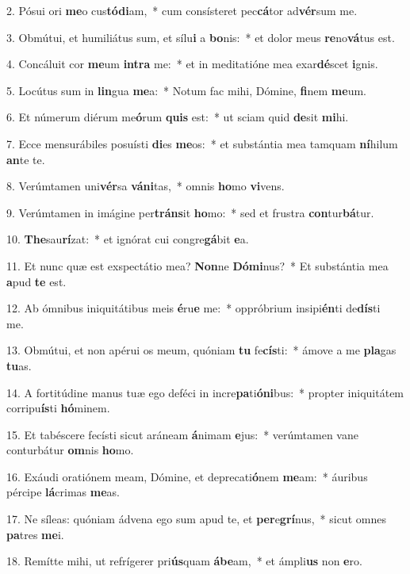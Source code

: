 2. Pósui ori \textbf{me}o cus\textbf{tó}\textbf{di}am,~*  cum consísteret pec\textbf{cá}tor ad\textbf{vér}sum me.\

3. Obmútui, et humiliátus sum, et sílu\textbf{i} a \textbf{bo}nis:~*  et dolor meus \textbf{re}no\textbf{vá}tus est.\

4. Concáluit cor \textbf{me}um \textbf{in}\textbf{tra} me:~*  et in meditatióne mea exar\textbf{dé}scet \textbf{i}gnis.\

5. Locútus sum in \textbf{lin}gua \textbf{me}a:~*  Notum fac mihi, Dómine, \textbf{fi}nem \textbf{me}um.\

6. Et númerum diérum me\textbf{ó}rum \textbf{quis} est:~*  ut sciam quid \textbf{de}sit \textbf{mi}hi.\

7. Ecce mensurábiles posuísti \textbf{di}es \textbf{me}os:~*  et substántia mea tamquam \textbf{ní}hilum \textbf{an}te te.\

8. Verúmtamen uni\textbf{vér}sa \textbf{vá}\textbf{ni}tas,~*  omnis \textbf{ho}mo \textbf{vi}vens.\

9. Verúmtamen in imágine per\textbf{tráns}it \textbf{ho}mo:~*  sed et frustra \textbf{con}tur\textbf{bá}tur.\

10. \textbf{The}sau\textbf{rí}zat:~*  et ignórat cui congre\textbf{gá}bit \textbf{e}a.\

11. Et nunc quæ est exspectátio mea? \textbf{Non}ne \textbf{Dó}\textbf{mi}nus?~*  Et substántia mea \textbf{a}pud \textbf{te} est.\

12. Ab ómnibus iniquitátibus meis \textbf{é}ru\textbf{e} me:~*  oppróbrium insipi\textbf{én}ti de\textbf{dís}ti me.\

13. Obmútui, et non apérui os meum, quóniam \textbf{tu} fe\textbf{cís}ti:~*  ámove a me \textbf{pla}gas \textbf{tu}as.\

14. A fortitúdine manus tuæ ego deféci in incre\textbf{pa}ti\textbf{ó}\textbf{ni}bus:~*  propter iniquitátem corripu\textbf{ís}ti \textbf{hó}minem.\

15. Et tabéscere fecísti sicut aráneam \textbf{á}nimam \textbf{e}jus:~*  verúmtamen vane conturbátur \textbf{om}nis \textbf{ho}mo.\

16. Exáudi oratiónem meam, Dómine, et deprecati\textbf{ó}nem \textbf{me}am:~*  áuribus pércipe \textbf{lá}crimas \textbf{me}as.\

17. Ne síleas: quóniam ádvena ego sum apud te, et \textbf{per}e\textbf{grí}nus,~*  sicut omnes \textbf{pa}tres \textbf{me}i.\

18. Remítte mihi, ut refrígerer pri\textbf{ús}quam \textbf{á}\textbf{be}am,~*  et ámpli\textbf{us} non \textbf{e}ro.\

